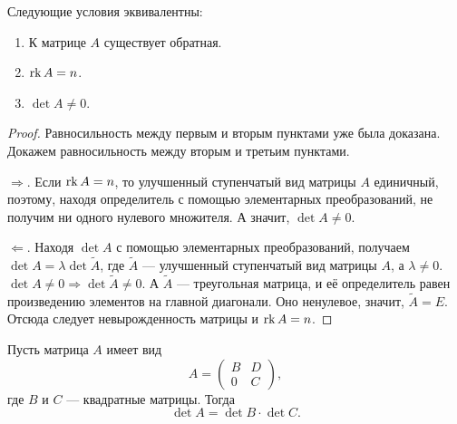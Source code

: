 \begin{theorem}
    Следующие условия эквивалентны:
    \begin{enumerate}[nolistsep]
        \item К матрице $A$ существует обратная.
        \item $\mathrm{rk}\, A = n$.
        \item $\det A \ne 0$.
    \end{enumerate}
\end{theorem}

\begin{proof}
    Равносильность между первым и вторым пунктами уже была доказана. Докажем равносильность между вторым и третьим пунктами. 

    $\Rightarrow$. Если $\mathrm{rk}\, A = n$, то улучшенный ступенчатый вид матрицы $A$ единичный, поэтому, находя определитель с помощью элементарных преобразований, не получим ни одного нулевого множителя. А значит, $\det A \ne 0$.

    $\Leftarrow$. Находя $\det A$ с помощью элементарных преобразований, получаем $\det A = \lambda \det \widetilde{A}$, где $\widetilde{A}$ --- улучшенный ступенчатый вид матрицы $A$, а $\lambda \ne 0$. $\det A \ne 0 \Rightarrow \det \widetilde{A} \ne 0$. А $\widetilde{A}$ --- треугольная матрица, и её определитель равен произведению элементов на главной диагонали. Оно ненулевое, значит, $\widetilde{A} = E$. Отсюда следует невырожденность матрицы и $\mathrm{rk}\, A = n$.
\end{proof}

\begin{theorem}
    Пусть матрица $A$ имеет вид
    $$
    A =
    \begin{pmatrix}
        B & D\\
        0 & C
    \end{pmatrix},
    $$
    где $B$ и $C$ --- квадратные матрицы. Тогда
    $$
    \det A = \det B \cdot \det C.
    $$
\end{theorem}

